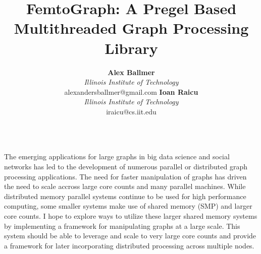 \documentclass[35pt,landscape]{tikzposter}
\title{FemtoGraph: A Pregel Based Multithreaded
  Graph Processing Library}
\author{
  \textbf{Alex Ballmer}\\
  \textit{Illinois Institute of Technology}\\
  alexandersballmer@gmail.com
  \textbf{Ioan Raicu}\\
  \textit{Illinois Institute of Technology}\\
  iraicu@cs.iit.edu
}
\begin{document}
\maketitle

\begin{columns}
     {


  The emerging applications for large graphs in big data science and social networks has led to the development of numerous parallel or distributed graph processing applications. The need for faster manipulation of graphs has driven the need to scale accross large core counts and many parallel machines. While distributed memory parallel systems continue to be used for high performance computing, some smaller systems make use of shared memory (SMP) and larger core counts. I hope to explore ways to utilize these larger shared memory systems by implementing a framework for manipulating graphs at a large scale. This system should be able to leverage and scale to very large core counts and provide a framework for later incorporating distributed processing across multiple nodes.


    }

    
\end{columns}
\end{document}
